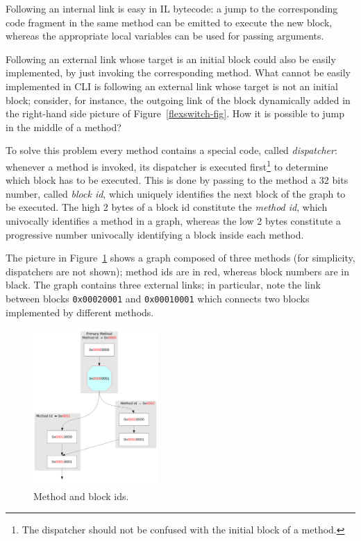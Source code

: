 Following an internal link is easy in IL bytecode: a jump to
the corresponding code fragment in the same method can be emitted 
to execute the new block, whereas the appropriate local variables can be
used for passing arguments. 

Following an external link whose target is an initial block could also
be easily implemented, by just invoking the corresponding method.
What cannot be easily implemented in CLI is following an external link
whose target is not an initial block; consider, for instance, the
outgoing link of the block dynamically added in the right-hand side
picture of Figure~\ref{flexswitch-fig}. How it is possible to jump in 
the middle of a method?

To solve this problem every method contains a special code, called
\emph{dispatcher}: whenever a method is invoked, its dispatcher is
executed first\footnote{The dispatcher should not be
confused with the initial block of a method.} to
determine which block has to be executed.
This is done by passing to the method a 32 bits number, called 
\emph{block id}, which uniquely identifies the next block of the graph to be executed.
The high 2 bytes of a block id constitute the \emph{method id}, which 
univocally identifies a method in a graph, whereas the low 2 bytes constitute
a progressive number univocally identifying a block inside each method.

The picture in Figure~\ref{block-id-fig} shows a graph composed of three methods (for
simplicity, dispatchers are not shown); method ids are in red, whereas
block numbers are in black. 
The graph contains three external links; in particular, note the link
between blocks \texttt{0x00020001} and \texttt{0x00010001} which
connects two blocks implemented by different methods.
\begin{figure}[h]
\begin{center}
\includegraphics[height=6cm]{blockid}
\caption{Method and block ids.}\label{block-id-fig}
\end{center}
\end{figure}

